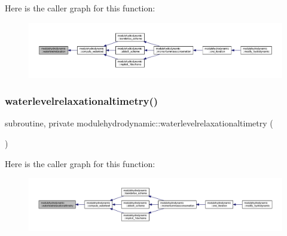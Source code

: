 Here is the caller graph for this function\+:\nopagebreak
\begin{figure}[H]
\begin{center}
\leavevmode
\includegraphics[width=350pt]{namespacemodulehydrodynamic_af6e5fcf3d54f676a11ab22c650353cef_icgraph}
\end{center}
\end{figure}
\mbox{\label{namespacemodulehydrodynamic_aaf7d95cf12308ea359a620a3f357b5c5}} 
\subsubsection{\texorpdfstring{waterlevelrelaxationaltimetry()}{waterlevelrelaxationaltimetry()}}
{\footnotesize\ttfamily subroutine, private modulehydrodynamic\+::waterlevelrelaxationaltimetry (\begin{DoxyParamCaption}{ }\end{DoxyParamCaption})\hspace{0.3cm}{\ttfamily [private]}}

Here is the caller graph for this function\+:\nopagebreak
\begin{figure}[H]
\begin{center}
\leavevmode
\includegraphics[width=350pt]{namespacemodulehydrodynamic_aaf7d95cf12308ea359a620a3f357b5c5_icgraph}
\end{center}
\end{figure}
\mbox{\label{namespacemodulehydrodynamic_a5bdef2c140ebc772066fbee498f4cccb}} 

